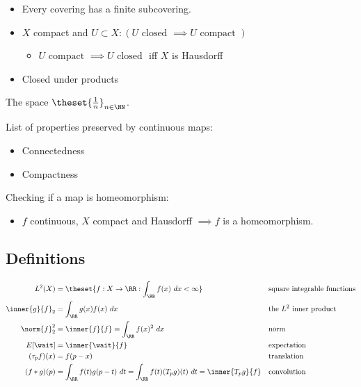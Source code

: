 \begin{itemize}
  \begin{itemize}
  \tightlist
  \item
    Every covering has a finite subcovering.
  \item
    \(X\) compact and
    \(U \subset X: (U \text{ closed } \implies U \text{ compact })\)

    \begin{itemize}
    \tightlist
    \item
      \(U \text{ compact } \implies U \text{ closed }\) iff \(X\) is
      Hausdorff
    \end{itemize}
  \item
    Closed under products
  \end{itemize}
\end{itemize}

\begin{example}[?]

The space \(\theset{\frac{1}{n}}_{n\in \NN}\).

\end{example}

List of properties preserved by continuous maps:

\begin{itemize}
\tightlist
\item
  Connectedness
\item
  Compactness
\end{itemize}

Checking if a map is homeomorphism:

\begin{itemize}
\tightlist
\item
  \(f\) continuous, \(X\) compact and Hausdorff \(\implies f\) is a
  homeomorphism.
\end{itemize}

\hypertarget{definitions-2}{%
\subsection{Definitions}\label{definitions-2}}

\begin{align*}
L^2(X) &= \theset{f: X \to \RR: \int_\RR f(x) ~dx < \infty} 
&&\text{square integrable functions}\\
\inner{g}{f}_{2} &= \int_\RR g(x)f(x) ~dx 
&&\text{the } L^2 \text{ inner product}\\
\norm{f}_2^2 &= \inner{f}{f} = \int_\RR f(x)^2 ~dx
&&\text{norm}\\
E[\wait] &= \inner{\wait}{f} 
&&\text{expectation}\\
(\tau_{p}f)(x) &= f(p- x) 
&&\text{translation}\\
(f \ast g)(p) &= \int_\RR f(t)g(p-t)~dt = \int_\RR f(t)(T_{p}g)(t) ~dt = \inner{T_pg}{f} 
&&\text{convolution}\\
\end{align*}

